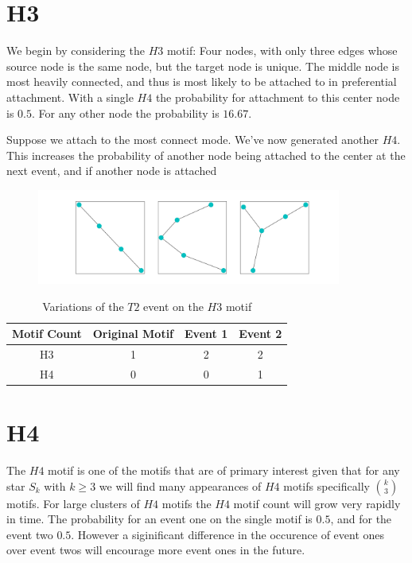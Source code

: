 \section{H3}
We begin by considering the $H3$ motif: Four nodes, with only three edges whose source node is the same
node, but the target node is unique. The middle node is most heavily connected, and thus is most likely
to be attached to in preferential attachment. With a single $H4$ the probability for attachment to this
center node is $0.5$. For any other node the probability is $16.67$. 


Suppose we attach to the most connect mode. We've now generated another $H4$. This increases the probability
of another node being attached to the center at the next event, and if another node is attached 

\begin{figure}[!ht]
    \includegraphics[width=10cm]{Images/H3_evolution.png}
    \centering
\end{figure}
\FloatBarrier



\begin{table}[h!]
    \centering
        \begin{tabular}{||c c c c||} 
            \hline
            Motif Count & Original Motif & Event 1 & Event 2\\ [0.5ex] 
            \hline\hline
            H3 & 1 & 2 & 2\\ 
            \hline
            H4 & 0 & 0 & 1\\
            \hline
        \end{tabular}
        \caption{Variations of the $T2$ event on the $H3$ motif}
        \label{table:1}
\end{table}

\section{H4}
The $H4$ motif is one of the motifs that are of primary interest given that for any star $S_k$
with $k \geq 3$ we will find many appearances of $H4$ motifs specifically ${k \choose 3}$ motifs. For large
clusters of $H4$ motifs the $H4$ motif count will grow very rapidly in time. The probability 
for an event one on the single motif is $0.5$, and for the event two $0.5$. However a siginificant
difference in the occurence of event ones over event twos will encourage more event ones in the future. 


